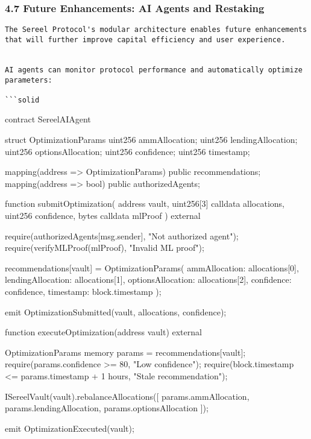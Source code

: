 \documentclass[12pt]{article}
\begin{document}
\subsubsection{4.7 Future Enhancements: AI Agents and Restaking} %

\begin{lstlisting}
The Sereel Protocol's modular architecture enables future enhancements that will further improve capital efficiency and user experience.


AI agents can monitor protocol performance and automatically optimize parameters:

```solid
\end{lstlisting}
contract SereelAIAgent {    struct OptimizationParams {        uint256 ammAllocation;        uint256 lendingAllocation;        uint256 optionsAllocation;        uint256 confidence;        uint256 timestamp;    }

    mapping(address => OptimizationParams) public recommendations;    mapping(address => bool) public authorizedAgents;

    function submitOptimization(        address vault,        uint256[3] calldata allocations,        uint256 confidence,        bytes calldata mlProof    ) external {        require(authorizedAgents[msg.sender], "Not authorized agent");        require(verifyMLProof(mlProof), "Invalid ML proof");

        recommendations[vault] = OptimizationParams({            ammAllocation: allocations[0],            lendingAllocation: allocations[1],            optionsAllocation: allocations[2],            confidence: confidence,            timestamp: block.timestamp        });

        emit OptimizationSubmitted(vault, allocations, confidence);    }

    function executeOptimization(address vault) external {        OptimizationParams memory params = recommendations[vault];        require(params.confidence >= 80, "Low confidence");        require(block.timestamp <= params.timestamp + 1 hours, "Stale recommendation");

        ISereelVault(vault).rebalanceAllocations([            params.ammAllocation,            params.lendingAllocation,            params.optionsAllocation        ]);

        emit OptimizationExecuted(vault);    }}
\end{document}
